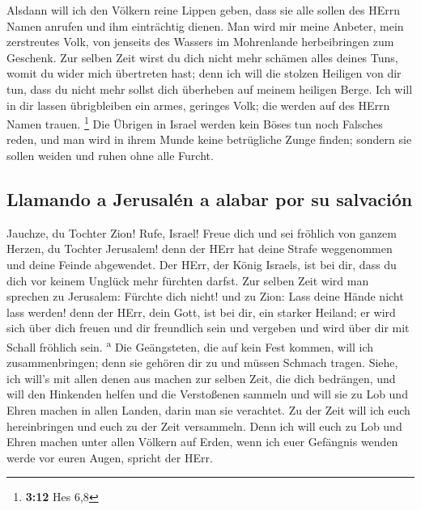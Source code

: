 Alsdann will ich den Völkern reine Lippen geben, dass sie
alle sollen des HErrn Namen anrufen und ihm einträchtig dienen.
 Man wird mir meine Anbeter, mein zerstreutes Volk, von
jenseits des Wassers im Mohrenlande herbeibringen zum Geschenk.
 Zur selben Zeit wirst du dich nicht mehr schämen alles
deines Tuns, womit du wider mich übertreten hast; denn ich will die
stolzen Heiligen von dir tun, dass du nicht mehr sollst dich überheben
auf meinem heiligen Berge.  Ich will in dir lassen
übrigbleiben ein armes, geringes Volk; die werden auf des HErrn Namen
trauen. \footnote{\textbf{3:12} Hes 6,8}  Die Übrigen in
Israel werden kein Böses tun noch Falsches reden, und man wird in ihrem
Munde keine betrügliche Zunge finden; sondern sie sollen weiden und
ruhen ohne alle Furcht.

\hypertarget{llamando-a-jerusaluxe9n-a-alabar-por-su-salvaciuxf3n}{%
\subsection{Llamando a Jerusalén a alabar por su
salvación}\label{llamando-a-jerusaluxe9n-a-alabar-por-su-salvaciuxf3n}}

 Jauchze, du Tochter Zion! Rufe, Israel! Freue dich und
sei fröhlich von ganzem Herzen, du Tochter Jerusalem! 
denn der HErr hat deine Strafe weggenommen und deine Feinde abgewendet.
Der HErr, der König Israels, ist bei dir, dass du dich vor keinem
Unglück mehr fürchten darfst.  Zur selben Zeit wird man
sprechen zu Jerusalem: Fürchte dich nicht! und zu Zion: Lass deine Hände
nicht lass werden!  denn der HErr, dein Gott, ist bei
dir, ein starker Heiland; er wird sich über dich freuen und dir
freundlich sein und vergeben und wird über dir mit Schall fröhlich sein.
\textsuperscript{a}  Die Geängsteten, die auf kein Fest
kommen, will ich zusammenbringen; denn sie gehören dir zu und müssen
Schmach tragen.  Siehe, ich will's mit allen denen aus
machen zur selben Zeit, die dich bedrängen, und will den Hinkenden
helfen und die Verstoßenen sammeln und will sie zu Lob und Ehren machen
in allen Landen, darin man sie verachtet.  Zu der Zeit
will ich euch hereinbringen und euch zu der Zeit versammeln. Denn ich
will euch zu Lob und Ehren machen unter allen Völkern auf Erden, wenn
ich euer Gefängnis wenden werde vor euren Augen, spricht der HErr.
